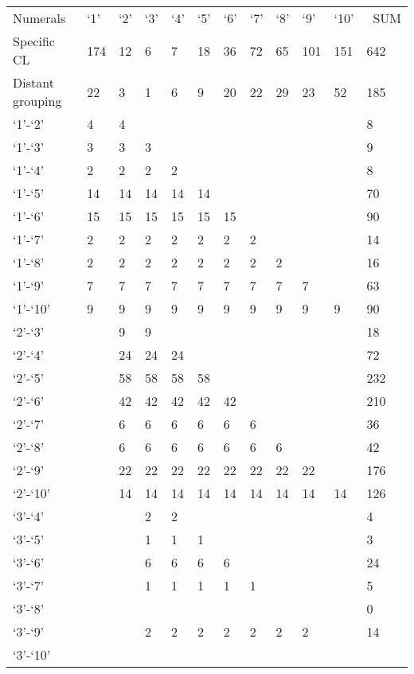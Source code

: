 \begin{table}
\begin{tabularx}{\textwidth}{lXXXXXXXXXXX}
\lsptoprule

{Numerals} & {‘1}{’} & {‘2}{’} & {‘3}{’} & {‘4}{’} & {‘5}{’} & {‘6}{’} & {‘7}{’} & {‘8}{’} & {‘9}{’} & {‘10}{’} & {~SUM}\\
Specific CL & {\cellcolor{red} 174} & 12 & 6 & 7 & 18 & 36 &{\cellcolor{red}  72} & {\cellcolor{red} 65} & {\cellcolor{red} 101} &{\cellcolor{red}  151} & 642\\
Distant grouping & 22 & 3 & 1 & 6 & 9 & 20 & 22 & 29 & 23 & 52 & 185\\
\midrule
‘1’-‘2’ & 4 & 4 & & ~ & & ~ & & ~ & & ~ & 8\\
‘1’-‘3’ & 3 & 3 & 3 & & ~ & & ~ & & ~ & & 9\\
‘1’-‘4’ & 2 & 2 & 2 & 2 & & ~ & & ~ & & ~ & 8\\
‘1’-‘5’ & 14 & 14 & 14 & 14 & 14 & & ~ & & ~ & & 70\\
‘1’-‘6’ & 15 & 15 & 15 & 15 & 15 & 15 & & ~ & & ~ & 90\\
‘1’-‘7’ & 2 & 2 & 2 & 2 & 2 & 2 & 2 & & ~ & & 14\\
‘1’-‘8’ & 2 & 2 & 2 & 2 & 2 & 2 & 2 & 2 & & ~ & 16\\
‘1’-‘9’ & 7 & 7 & 7 & 7 & 7 & 7 & 7 & 7 & 7 & & 63\\
‘1’-‘10’ & 9 & 9 & 9 & 9 & 9 & 9 & 9 & 9 & 9 & 9 & 90\\
‘2’-‘3’ & & 9 & 9 & & ~ & & ~ & & ~ & & 18\\
‘2’-‘4’ & & 24 & 24 & 24 & & ~ & & ~ & & ~ & 72\\
‘2’-‘5’ & & \cellcolor{red} 58 &\cellcolor{red}  58 &\cellcolor{red}  58 &\cellcolor{red}  58 & & ~ & & ~ & & 232\\
‘2’-‘6’ & & \cellcolor{red} 42 & \cellcolor{red} 42 &\cellcolor{red}  42 & \cellcolor{red} 42 &\cellcolor{red}  42 & & ~ & & ~ & 210\\
‘2’-‘7’ & & 6 & 6 & 6 & 6 & 6 & 6 & & ~ & & 36\\
‘2’-‘8’ & & 6 & 6 & 6 & 6 & 6 & 6 & 6 & & ~ & 42\\
‘2’-‘9’ & & 22 & 22 & 22 & 22 & 22 & 22 & 22 & 22 & & 176\\
‘2’-‘10’ & & 14 & 14 & 14 & 14 & 14 & 14 & 14 & 14 & 14 & 126\\
‘3’-‘4’ & & ~ & 2 & 2 & & ~ & & ~ & & ~ & 4\\
‘3’-‘5’ & & ~ & 1 & 1 & 1 & & ~ & & ~ & & 3\\
‘3’-‘6’ & & ~ & 6 & 6 & 6 & 6 & & ~ & & ~ & 24\\
‘3’-‘7’ & & ~ & 1 & 1 & 1 & 1 & 1 & & ~ & & 5\\
‘3’-‘8’ & & ~ & & ~ & & ~ & & ~ & & ~ & 0\\
‘3’-‘9’ & & ~ & 2 & 2 & 2 & 2 & 2 & 2 & 2 & & 14\\
‘3’-‘10’ & & ~ & & ~ & & ~ & & ~ & & ~ & ~\\
\midrule
\end{tabularx}
\end{table}
